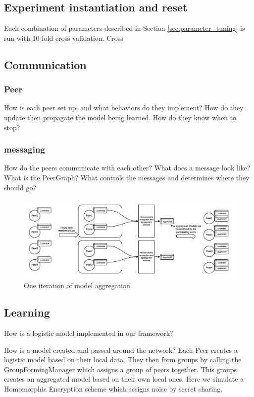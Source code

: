 \subsection{Experiment instantiation and reset}

Each combination of parameters described in Section \ref{sec:parameter_tuning} is run with 10-fold cross validation. Cross 

\subsection{Communication}
\subsubsection{Peer}
How is each peer set up, and what behaviors do they implement? 
How do they update then propagate the model being learned.
How do they know when to stop?
\subsubsection{messaging}
How do the peers communicate with each other?
What does a message look like?
What is the PeerGraph?
What controls the messages and determines where they should go?
\begin{figure}[h!]
	\centering
	\includegraphics[width=\textwidth]{fig/peerModelCreation}
	\caption{One iteration of model aggregation}
	\label{fig:peerAggregationFigure}
\end{figure}


\subsection{Learning}
How is a logistic model implemented in our framework?

How is a model created and passed around the network?
Each Peer creates a logistic model based on their local data. They then form groups by calling the GroupFormingManager which assigns a group of peers together. This groups creates an aggregated model based on their own local ones. Here we simulate a Homomorphic Encryption scheme which assigns noise by secret sharing. 


